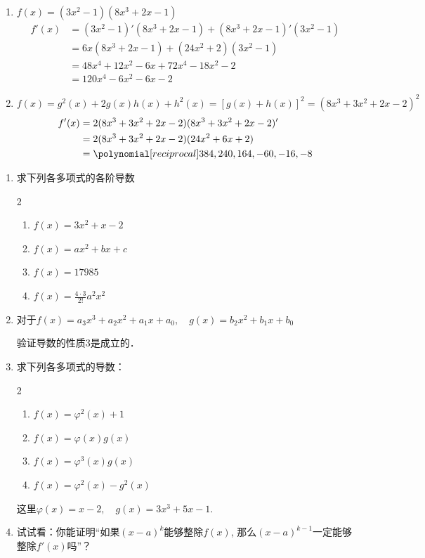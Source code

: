     \begin{solution}
\begin{enumerate}
    \item $f(x)=(3x^2-1)(8x^3+2x-1)$
\[\begin{split}
    f' (x) &= (3x^2-1)' (8x^3+2x-1)+(8x^3+2x-1)' (3x^2-1) \\
    &=6x (8x^3+2x-1) + (24x^2+2) (3x^2-1)\\
    &=48x^4+12x^2-6x+72x^4-18x^2-2\\
    &=120x^4-6x^2-6x-2
\end{split}\]
    \item $f(x)=g^2 (x) +2g (x) h (x) +h^2 (x) =[g(x)+h(x)]^2=(8x^3+3x^2+2x-2)^2$
\[\begin{split}
    f'(x)&=2(8x^3+3x^2+2x-2)(8x^3+3x^2+2x-2)'\\
    &=2(8x^3+3x^2+2x-2)(24x^2+6x+2)\\
    &=\poly{384,240,164,-60,-16,-8}
\end{split}\]
\end{enumerate}
 \end{solution}
           
\begin{ex}
\begin{enumerate}
    \item 求下列各多项式的各阶导数
\begin{multicols}{2}
\begin{enumerate}
    \item $f (x) =3x^2+x-2$
    \item $f(x) =ax^2+bx+c$
    \item $f(x)=17985$
    \item $f(x)=\frac{4\cdot 3}{2!}a^2x^2$
\end{enumerate}
\end{multicols}

    \item 对于$f(x)=a_3x^3+a_2x^2+a_1x+a_0,\quad g(x)=b_2x^2+b_1x+b_0$
    
    验证导数的性质3是成立的．

    \item 求下列各多项式的导数：
\begin{multicols}{2}
\begin{enumerate}
    \item $f (x) =\varphi^2 (x) +1$
    \item $f(x)=\varphi(x)g(x)$
    \item $f (x) =\varphi^3 (x) g (x)$
    \item $f(x)=\varphi^2(x)-g^2(x)$
\end{enumerate}
\end{multicols}
这里$\varphi(x)=x-2,\quad g(x)=3x^3+5x-1$.
    \item 试试看：你能证明“如果$(x-a)^k$能够整除$f(x)$, 那么$(x-a)^{k-1}$一定能够整除$f'(x)$吗”？
\end{enumerate}
\end{ex}
 
